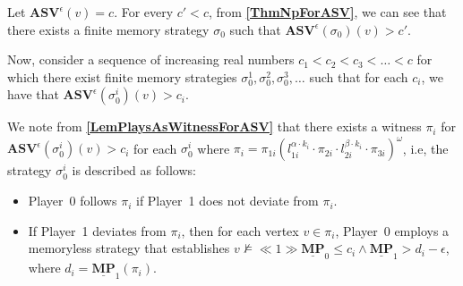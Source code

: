 Let $\mathbf{ASV}^{\epsilon}(v) = c$.
For every $c' < c$, from \textbf{\cref{ThmNpForASV}}, we can see that there exists a finite memory strategy $\sigma_0$ such that $\mathbf{ASV}^{\epsilon}(\sigma_0)(v) > c'$.


Now, consider a sequence of increasing real numbers $c_1 < c_2 < c_3 < \dotsc < c$ for which there exist finite memory strategies $\sigma_0^{1}, \sigma_0^{2}, \sigma_0^{3}, \dotsc$ such that for each $c_i$, we have that $ \mathbf{ASV}^{\epsilon}(\sigma_0^i)(v) > c_i$.

We note from \textbf{\cref{LemPlaysAsWitnessForASV}} that there exists a witness $\pi_i$ for $ \mathbf{ASV}^{\epsilon}(\sigma_0^i)(v) > c_i$ for each $\sigma_0^i$ where $\pi_i= \pi_{1i}(l^{\alpha \cdot k_i}_{1i} \cdot \pi_{2i} \cdot l^{\beta \cdot k_i}_{2i} \cdot \pi_{3i})^{\omega}$, i.e, the strategy $\sigma_0^i$ is described as follows:
\begin{itemize}
    \item Player~0 follows $\pi_i$ if Player~1 does not deviate from $\pi_i$.
    \item If Player~1 deviates from $\pi_i$, then for each vertex $v \in \pi_i$, Player~0 employs a memoryless strategy that establishes $v \nvDash \ll 1 \gg \underline{\mathbf{MP}}_0 \leqslant c_i \land \underline{\mathbf{MP}}_1 > d_i - \epsilon$, where $d_i = \underline{\mathbf{MP}}_1(\pi_i)$.
\end{itemize}


